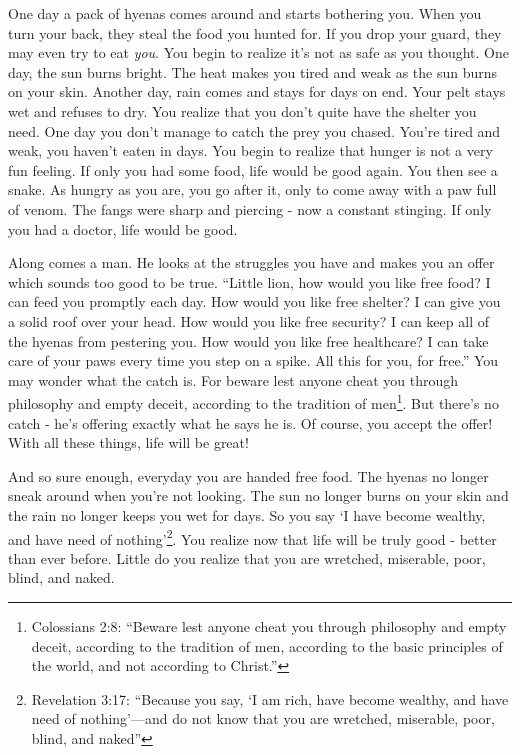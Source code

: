 \documentclass[10pt]{article}
\begin{document}
\begin{multicols}{2}
One day a pack of hyenas comes around and starts bothering you. When you turn your back, they steal the food you hunted for. If you drop your guard, they may even try to eat \textit{you}. You begin to realize it's not as safe as you thought. One day, the sun burns bright. The heat makes you tired and weak as the sun burns on your skin. Another day, rain comes and stays for days on end. Your pelt stays wet and refuses to dry. You realize that you don't quite have the shelter you need. One day you don't manage to catch the prey you chased. You're tired and weak, you haven't eaten in days. You begin to realize that hunger is not a very fun feeling. If only you had some food, life would be good again. You then see a snake. As hungry as you are, you go after it, only to come away with a paw full of venom. The fangs were sharp and piercing - now a constant stinging. If only you had a doctor, life would be good.

Along comes a man. He looks at the struggles you have and makes you an offer which sounds too good to be true. ``Little lion, how would you like free food? I can feed you promptly each day. How would you like free shelter? I can give you a solid roof over your head. How would you like free security? I can keep all of the hyenas from pestering you. How would you like free healthcare? I can take care of your paws every time you step on a spike. All this for you, for free.'' You may wonder what the catch is. For beware lest anyone cheat you through philosophy and empty deceit, according to the tradition of men\footnote{Colossians 2:8: ``Beware lest anyone cheat you through philosophy and empty deceit, according to the tradition of men, according to the basic principles of the world, and not according to Christ.''}. But there's no catch - he's offering exactly what he says he is. Of course, you accept the offer! With all these things, life will be great!

And so sure enough, everyday you are handed free food. The hyenas no longer sneak around when you're not looking. The sun no longer burns on your skin and the rain no longer keeps you wet for days. So you say `I have become wealthy, and have need of nothing'\footnote{Revelation 3:17: ``Because you say, ‘I am rich, have become wealthy, and have need of nothing’—and do not know that you are wretched, miserable, poor, blind, and naked''}. You realize now that life will be truly good - better than ever before. Little do you realize that you are wretched, miserable, poor, blind, and naked\footnotemark[\value{footnote}].


\end{multicols}
\end{document}
